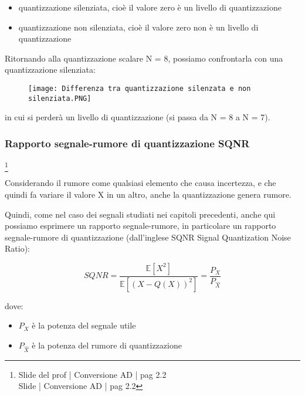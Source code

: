 \begin{itemize}
    \item quantizzazione silenziata, cioè il valore zero è un livello di quantizzazione 
    \item quantizzazione non silenziata, cioè il valore zero non è un livello di quantizzazione
\end{itemize}

\newpage 

Ritornando alla quantizzazione scalare N = 8, possiamo confrontarla con una quantizzazione silenziata: 

\begin{figure}[h]
    \centering
    \texttt{[image: Differenza tra quantizzazione silenzata e non silenziata.PNG]}
\end{figure} 

in cui si perderà un livello di quantizzazione (si passa da N = 8 a N = 7). \newline 

\newpage 

\subsubsection{Rapporto segnale-rumore di quantizzazione SQNR}
\footnote{Slide del prof | Conversione AD | pag 2.2 \\  
Slide | Conversione AD | pag 2.2 
}

Considerando il rumore come qualsiasi elemento che causa incertezza, e che quindi fa variare il valore X in un altro, 
anche la quantizzazione genera rumore. \newline 

Quindi, come nel caso dei segnali studiati nei capitoli precedenti, anche qui possiamo esprimere un rapporto segnale-rumore, 
in particolare un rapporto segnale-rumore di quantizzazione (dall'inglese SQNR Signal Quantization Noise Ratio): 

{
    \Large 
    \begin{equation}
        SQNR 
        = 
        \frac{\mathbb{E} \left[ X^{2}\right]}{\mathbb{E} \left[( X - Q(X))^{2}\right]} 
        =
        \frac{P_X}{P_{\hat{X}}}
    \end{equation}
}

dove: 

\begin{itemize}
    \item $P_X$ è la potenza del segnale utile 
    \item $P_{\hat{X}}$ è la potenza del rumore di quantizzazione
\end{itemize}

